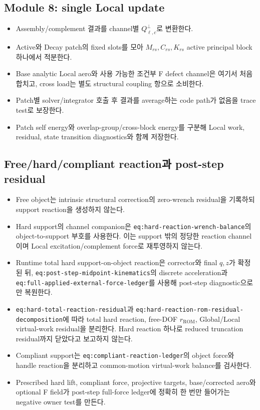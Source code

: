 \documentclass[10pt,a4paper]{article}
\newcommand{\todo}{\textcolor{TodoGray}{\(\square\)}}
\newcommand{\code}[1]{\texttt{#1}}
\begin{document}
\subsection*{Module 8: single Local update}

\begin{itemize}
  \item[\todo] Assembly/complement 결과를 channel별 \(Q_{\ell,c}^{\perp}\)로 변환한다.
  \item[\todo] Active와 Decay patch의 fixed slots를 모아 \(M_{rs},C_{rs},K_{rs}\) active principal block 하나에서 적분한다.
  \item[\todo] Base analytic Local aero와 사용 가능한 조건부 F defect channel은 여기서 처음 합치고, cross load는 별도 structural coupling 항으로 소비한다.
  \item[\todo] Patch별 solver/integrator 호출 후 결과를 average하는 code path가 없음을 trace test로 보장한다.
  \item[\todo] Patch self energy와 overlap-group/cross-block energy를 구분해 Local work, residual, state transition diagnostics와 함께 저장한다.
\end{itemize}

\subsection*{Free/hard/compliant reaction과 post-step residual}

\begin{itemize}
  \item[\todo] Free object는 intrinsic structural correction의 zero-wrench residual을 기록하되
  support reaction을 생성하지 않는다.
  \item[\todo] Hard support의 channel companion은
  \code{eq:hard-reaction-wrench-balance}의 object-to-support 부호를 사용한다.
  이는 support 밖의 정당한 reaction channel이며 Local excitation/complement force로 재투영하지 않는다.
  \item[\todo] Runtime total hard support-on-object reaction은 corrector와 final \(q,z\)가 확정된 뒤,
  \code{eq:post-step-midpoint-kinematics}의 discrete acceleration과
  \code{eq:full-applied-external-force-ledger}를 사용해 post-step diagnostic으로만 복원한다.
  \item[\todo] \code{eq:hard-total-reaction-residual}과
  \code{eq:hard-reaction-rom-residual-decomposition}에 따라
  total hard reaction, free-DOF \(r_{\mathrm{ROM}}\), Global/Local virtual-work residual을 분리한다.
  Hard reaction 하나로 reduced truncation residual까지 닫았다고 보고하지 않는다.
  \item[\todo] Compliant support는 \code{eq:compliant-reaction-ledger}의
  object force와 handle reaction을 분리하고 common-motion virtual-work balance를 검사한다.
  \item[\todo] Prescribed hard lift, compliant force, projective targets, base/corrected aero와
  optional F field가 post-step full-force ledger에 정확히 한 번만 들어가는 negative owner test를 만든다.
\end{itemize}
\end{document}
